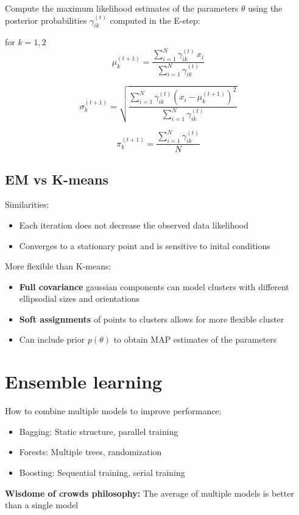 \documentclass[12pt,a4paper]{article}
\begin{document}
Compute the maximum likelihood estimates of the parameters $\theta$ using the posterior probabilities $\gamma_{ik}^{(t)}$ computed in the E-step:

\vspace{10pt}

for $k = 1, 2$
\[
\mu_k^{(t+1)} = \frac{\sum_{i=1}^{N} \gamma_{ik}^{(t)} \, x_i}{\sum_{i=1}^{N} \gamma_{ik}^{(t)}}
\]

\[
\sigma_k^{(t+1)} = \sqrt{\frac{\sum_{i=1}^{N} \gamma_{ik}^{(t)} \left(x_i - \mu_k^{(t+1)}\right)^2}{\sum_{i=1}^{N} \gamma_{ik}^{(t)}}}
\]

\[
\pi_k^{(t+1)} = \frac{\sum_{i=1}^{N} \gamma_{ik}^{(t)}}{N}
\]

\subsection{EM vs K-means}
Similarities:
\begin{itemize}
    \item Each iteration does not decrease the observed data likelihood
    \item Converges to a stationary point and is sensitive to inital conditions
\end{itemize}

More flexible than K-means:
\begin{itemize}
    \item \textbf{Full covariance} gaussian components can model clusters with different ellipsodial sizes and orientations
    \item \textbf{Soft assignments} of points to clusters allows for more flexible cluster
    \item Can include prior $p(\theta)$ to obtain MAP estimates of the parameters
\end{itemize}

\section{Ensemble learning}
How to combine multiple models to improve performance:
\begin{itemize}
    \item Bagging: Static structure, parallel training
    \item Forests: Multiple trees, randomization
    \item Boosting: Sequential training, serial training
\end{itemize}

\textbf{Wisdome of crowds philosophy:} The average of multiple models is better than a single model
\end{document}

